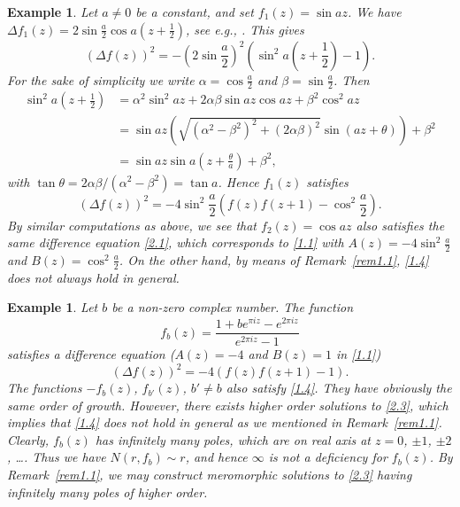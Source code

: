 \documentclass{amsart}
\newtheorem{example}[theorem]{Example}
\begin{document}
\begin{example}\label{ex2.1}
Let $a\ne0$ be a constant, and set $f_1(z)=\sin az$.
We have $\Delta f_1(z)=2\sin \frac{a}{2}\cos a(z+\frac{1}{2})$, see e.g., \cite[Theorem~2.2]{kelleyp:01}.
This gives
\begin{equation*}
(\Delta f(z))^2=-\left(2\sin \frac{a}{2}\right)^2\left(\sin^2a\left(z+\frac{1}{2}\right)-1\right).
\end{equation*}
For the sake of simplicity we write $\alpha=\cos\frac{a}{2}$ and $\beta=\sin\frac{a}{2}$.
Then
\begin{align*}
\sin^2 a\left(z+\frac{1}{2}\right)&=\alpha^2\sin^2az+2\alpha\beta\sin az\cos az+\beta^2 \cos^2az\\
&=\sin az\left(\sqrt{(\alpha^2-\beta^2)^2+(2\alpha\beta)^2}\sin (az+\theta)\right)+\beta^2\\
&=\sin az \sin a\left(z+\frac{\theta}{a}\right)+\beta^2,
\end{align*}
with $\tan\theta=2\alpha\beta/(\alpha^2-\beta^2)=\tan a$. Hence $f_1(z)$ satisfies
\begin{equation}
(\Delta f(z))^2=-4\sin^2\frac{a}{2}\left(f(z)f(z+1)-\cos^2\frac{a}{2}\right).\label{2.1}
\end{equation}
By similar computations as above, we see that $f_2(z)=\cos az$ also satisfies the same difference equation \eqref{2.1}, which corresponds to \eqref{1.1} with $A(z)=-4\sin^2\frac{a}{2}$ and
$B(z)=\cos^2\frac{a}{2}$.
On the other hand, by means of Remark~\ref{rem1.1}, \eqref{1.4} does not always hold in general.
\end{example}

\begin{example}\label{ex2.2} Let $b$ be a non-zero complex number. The function
\begin{equation}
f_b(z)=\frac{1+be^{\pi i z}-e^{2\pi i z}}{e^{2 \pi i z}-1}\label{2.2}
\end{equation}
satisfies a difference equation ($A(z)=-4$ and $B(z)=1$ in \eqref{1.1})
\begin{equation}
(\Delta f(z))^2=-4(f(z)f(z+1)-1).\label{2.3}
\end{equation}
The functions $-f_b(z)$, $f_{b'}(z)$, $b'\ne b$ also satisfy \eqref{1.4}.
They have obviously the same order of growth.
However, there exists higher order solutions to \eqref{2.3}, which implies that \eqref{1.4} does not hold in general as we mentioned in Remark~\ref{rem1.1}.
Clearly, $f_b(z)$ has infinitely many poles, which are on real axis at $z=0$, $\pm 1$, $\pm 2$, \dots. Thus we have
$N(r,f_b)\sim r$, and hence $\infty$ is not a deficiency for $f_b(z)$.
By Remark~\ref{rem1.1}, we may construct meromorphic solutions to
\eqref{2.3} having infinitely many poles of higher order.
\end{example}
\end{document}
